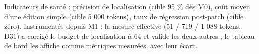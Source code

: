 Indicateurs de santé : précision de localisation (cible 95 \% dès M0), coût moyen d’une
édition simple (cible 5 000 tokens), taux de régression post-patch (cible zéro).
Instrumentés depuis M1 : la mesure effective (51 / 719 / 1 088 tokens, D31) a corrigé
le budget de localisation à 64 et valide les deux autres ; le tableau de bord les
affiche comme métriques mesurées, avec leur écart.

